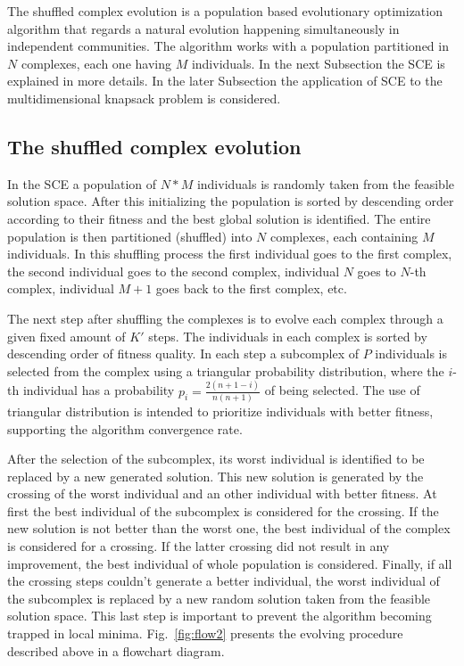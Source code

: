 The shuffled complex evolution is a population
based evolutionary optimization algorithm that regards a natural 
evolution happening simultaneously in independent communities.
The algorithm works with a population partitioned in $N$ complexes, each one
having $M$ individuals.
In the next Subsection the SCE is explained in more details.
In the later Subsection the application of SCE to the multidimensional knapsack
problem is considered.


\subsection{The shuffled complex evolution}
In the SCE a population of $N*M$ individuals is randomly taken from the
feasible solution space.
After this initializing the population is sorted by descending order according
to their fitness and the best global solution is identified.
The entire population is then partitioned (shuffled) into $N$ complexes,
each containing $M$ individuals.
In this shuffling process the first individual goes to the first complex, the second
individual goes to the second complex, individual $N$ goes to $N$-th complex,
individual $M+1$ goes back to the first complex, etc.

The next step after shuffling the complexes is to evolve each complex through
a given fixed amount of $K'$ steps.
The individuals in each complex is sorted by descending order of fitness quality.
In each step a subcomplex of $P$ individuals is selected from the
complex using a triangular probability distribution, where the $i$-th individual
has a probability $p_i = \frac{2(n+1-i)}{n(n+1)}$ of being selected.
The use of triangular distribution is intended to prioritize individuals with
better fitness, supporting the algorithm convergence rate.

After the selection of the subcomplex, its worst individual is identified to
be replaced by a new generated solution.
This new solution is generated by the crossing of the worst individual and an
other individual with better fitness.
At first the best individual of the subcomplex is considered for the crossing.
If the new solution is not better than the worst one, the best individual
of the complex is considered for a crossing.
If the latter crossing did not result in any improvement, the best individual
of whole population is considered.
Finally, if all the crossing steps couldn't generate a better individual,
the worst individual of the subcomplex is replaced by a new random solution taken
from the feasible solution space.
This last step is important to prevent the algorithm becoming trapped in local minima.
Fig.~\ref{fig:flow2} presents the evolving procedure described above in a flowchart diagram.

